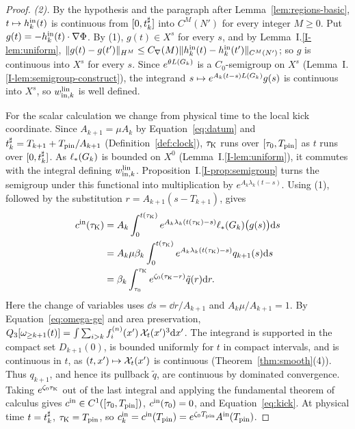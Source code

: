 \begin{proof}
\emph{(2).} By the hypothesis and the paragraph after
Lemma~\ref{lem:regions-basic}, $t\mapsto h^{\mathrm{in}}_k(t)$ is continuous from
$[0,t^\sharp_k]$ into $C^M(N')$ for every integer $M\ge0$. Put
$g(t)=-h^{\mathrm{in}}_k(t)\cdot\nabla\Phi$. By (1), $g(t)\in X^s$ for every $s$,
and by Lemma~I.\ref{I-lem:uniform},
$\|g(t)-g(t')\|_{H^M}\le C_{\nabla}(M)\|h^{\mathrm{in}}_k(t)-h^{\mathrm{in}}_k(t')\|_{C^M(N')}$;
so $g$ is continuous into $X^s$ for every $s$. Since $e^{\theta L(G_k)}$ is a
$C_0$-semigroup on $X^s$ (Lemma~I.\ref{I-lem:semigroup-construct}), the integrand
$s\mapsto e^{A_k(t-s)L(G_k)}g(s)$ is continuous into $X^s$, so
$w^{\mathrm{lin}}_{\mathrm{in},k}$ is well defined.

For the scalar calculation we change from physical time to the local kick
coordinate. Since $A_{k+1}=\mu A_k$ by Equation~\eqref{eq:datum} and
$t^\sharp_k=T_{k+1}+T_{\mathrm{pin}}/A_{k+1}$ (Definition~\ref{def:clock}), $\tau_{\mathrm{K}}$ runs over
$[\tau_0,T_{\mathrm{pin}}]$ as $t$ runs over $[0,t^\sharp_k]$. As $\ell_*(G_k)$ is bounded on
$X^0$ (Lemma~I.\ref{I-lem:uniform}), it commutes with the integral defining
$w^{\mathrm{lin}}_{\mathrm{in},k}$. Proposition~I.\ref{I-prop:semigroup} turns the semigroup
under this functional into multiplication by $e^{A_k\lambda_k(t-s)}$.
Using (1), followed by the substitution $r=A_{k+1}(s-T_{k+1})$, gives
\begin{align*}
c^{\mathrm{in}}(\tau_{\mathrm{K}})
&=A_k\int_0^{t(\tau_{\mathrm{K}})}e^{A_k\lambda_k(t(\tau_{\mathrm{K}})-s)}\ell_*(G_k)\big(g(s)\big)\dd s\\
&=A_k\mu\beta_k\int_0^{t(\tau_{\mathrm{K}})}e^{A_k\lambda_k(t(\tau_{\mathrm{K}})-s)}q_{k+1}(s)\dd s\\
&=\beta_k\int_{\tau_0}^{\tau_{\mathrm{K}}}e^{\zeta_0(\tau_{\mathrm{K}}-r)}\tilde q(r)\dd r.
\end{align*}
Here the change of variables uses $\dd s=\dd r/A_{k+1}$ and
$A_k\mu/A_{k+1}=1$.
By Equation~\eqref{eq:omega-ge} and area preservation,
$Q_3[\omega_{\ge k+1}(t)]=\int\sum_{i>k}f^{(n)}_i(x')\,\mathcal{X}_t(x')^3\dd x'$.
The integrand is supported in the compact set $D_{k+1}(0)$, is bounded uniformly
for $t$ in compact intervals, and is continuous in $t$, as
$(t,x')\mapsto\mathcal{X}_t(x')$ is continuous (Theorem~\ref{thm:smooth}\textup{(4)}).
Thus $q_{k+1}$, and hence its pullback $\tilde q$, are continuous by dominated
convergence. Taking $e^{\zeta_0\tau_{\mathrm{K}}}$ out of the last integral and applying the
fundamental theorem of calculus gives $c^{\mathrm{in}}\in C^1([\tau_0,T_{\mathrm{pin}}])$,
$c^{\mathrm{in}}(\tau_0)=0$, and Equation~\eqref{eq:kick}. At physical time $t=t^\sharp_k$,
$\tau_{\mathrm{K}}=T_{\mathrm{pin}}$, so
$c^{\mathrm{in}}_k=c^{\mathrm{in}}(T_{\mathrm{pin}})=e^{\zeta_0T_{\mathrm{pin}}}A^{\mathrm{in}}(T_{\mathrm{pin}})$.


\end{proof}
